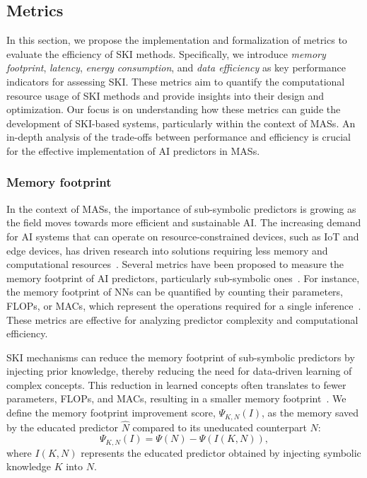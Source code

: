 \subsection{Metrics}\label{subsec:ski-meets-intelligent-agents-metrics}
%
In this section, we propose the implementation and formalization of metrics to evaluate the efficiency of \gls{SKI} methods.
%
Specifically, we introduce \emph{memory footprint}, \emph{latency}, \emph{energy consumption}, and \emph{data efficiency} as key performance indicators for assessing \gls{SKI}.
%
These metrics aim to quantify the computational resource usage of \gls{SKI} methods and provide insights into their design and optimization.
%
Our focus is on understanding how these metrics can guide the development of \gls{SKI}-based systems, particularly within the context of \glspl{MAS}.
%
An in-depth analysis of the trade-offs between performance and efficiency is crucial for the effective implementation of AI predictors in \glspl{MAS}.
%

\subsubsection{Memory footprint}\label{subsubsec:ski-meets-intelligent-agents-memory-footprint}
%
In the context of \glspl{MAS}, the importance of sub-symbolic predictors is growing as the field moves towards more efficient and sustainable \gls{AI}.
%
The increasing demand for \gls{AI} systems that can operate on resource-constrained devices, such as IoT and edge devices, has driven research into solutions requiring less memory and computational resources~\cite{CITATION}.
%
Several metrics have been proposed to measure the memory footprint of \gls{AI} predictors, particularly sub-symbolic ones~\cite{CITATION}.
%
For instance, the memory footprint of \glspl{NN} can be quantified by counting their parameters, \glspl{FLOP}, or \glspl{MAC}, which represent the operations required for a single inference~\cite{CITATION}.
%
These metrics are effective for analyzing predictor complexity and computational efficiency.

%
\Gls{SKI} mechanisms can reduce the memory footprint of sub-symbolic predictors by injecting prior knowledge, thereby reducing the need for data-driven learning of complex concepts.
%
This reduction in learned concepts often translates to fewer parameters, \glspl{FLOP}, and \glspl{MAC}, resulting in a smaller memory footprint~\cite{CITATION}.
%
We define the memory footprint improvement score, \(\Psi_{K,N}(I)\), as the memory saved by the educated predictor \(\hat{N}\) compared to its uneducated counterpart \(N\):
%
\begin{equation}
    \label{eq:memory-footprint-improvement-score}
    \Psi_{K,N}(I) = \Psi(N) - \Psi(I(K, N)),
\end{equation}
%
where \(I(K, N)\) represents the educated predictor obtained by injecting symbolic knowledge \(K\) into \(N\).


